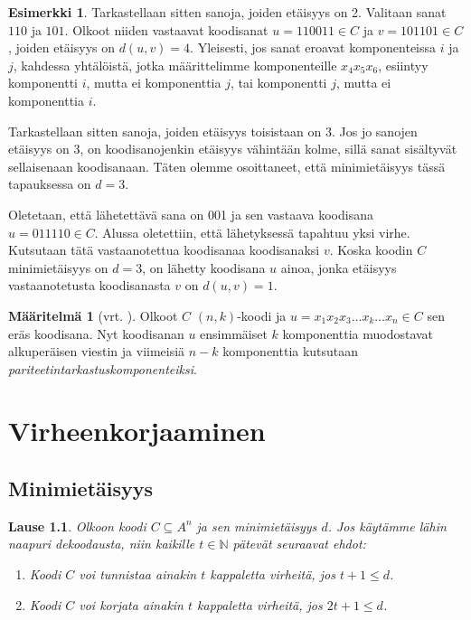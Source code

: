 \documentclass[a4paper,12pt,leqno,oneside]{report} %
\theoremstyle{plain}
\newtheorem{lause}{Lause}[chapter]
\theoremstyle{plain}
\theoremstyle{definition}
\newtheorem{maaritelma}{Määritelmä}[chapter]
\newtheorem{esimerkki}{Esimerkki}[chapter]
\theoremstyle{remark}
\numberwithin{equation}{chapter}
\newcommand*{\Nset}{\mathbb{N}}  %
\begin{document}
\begin{esimerkki}
        Tarkastellaan sitten sanoja, joiden etäisyys on 2. Valitaan sanat $110$ ja $101$. Olkoot niiden vastaavat koodisanat $u = 110011 \in C$ ja $v = 101101 \in C$, joiden etäisyys on $d(u, v) = 4$. Yleisesti, jos sanat eroavat komponenteissa $i$ ja $j$, kahdessa yhtälöistä, jotka määrittelimme komponenteille $x_4x_5x_6$, esiintyy komponentti $i$, mutta ei komponenttia $j$, tai komponentti $j$, mutta ei komponenttia $i$.%

        Tarkastellaan sitten sanoja, joiden etäisyys toisistaan on 3. Jos jo sanojen etäisyys on 3, on koodisanojenkin etäisyys vähintään kolme, sillä sanat sisältyvät sellaisenaan koodisanaan. Täten olemme osoittaneet, että minimietäisyys tässä tapauksessa on $d = 3$.

        Oletetaan, että lähetettävä sana on 001 ja sen vastaava koodisana $u = 011110 \in C$.
        Alussa oletettiin, että lähetyksessä tapahtuu yksi virhe. Kutsutaan tätä vastaanotettua koodisanaa koodisanaksi $v$. Koska koodin $C$ minimietäisyys on $d = 3$, on lähetty koodisana $u$ ainoa, jonka etäisyys vastaanotetusta koodisanasta $v$ on $d(u,v) = 1$.
    \end{esimerkki}

    \begin{maaritelma}[vrt. {\cite[s.~494]{PA}}]\label{maar:nkkoodi}
        Olkoot $C$ $(n, k)$-koodi ja $u = x_1x_2x_3\dots x_k \dots x_n \in C$ sen eräs koodisana. Nyt koodisanan $u$ ensimmäiset $k$ komponenttia muodostavat alkuperäisen viestin ja viimeisiä $n-k$ komponenttia kutsutaan \emph{pariteetintarkastuskomponenteiksi}.
    \end{maaritelma}

    \chapter{Virheenkorjaaminen}
    \section{Minimietäisyys}

    \begin{lause}\label{lause:nncorrection}
        Olkoon koodi $C \subseteq A^n$ ja sen minimietäisyys $d$. Jos käytämme lähin naapuri dekoodausta, niin kaikille $t \in \Nset$ pätevät seuraavat ehdot:
        \begin{enumerate}
            \item\label{kht:vtunnistus} Koodi $C$ voi tunnistaa ainakin $t$ kappaletta virheitä, jos $t + 1 \le d$.
            \item\label{kht:vkorjaus} Koodi $C$ voi korjata ainakin $t$ kappaletta virheitä, jos $2t + 1 \le d$.
        \end{enumerate}
    \end{lause}
\end{document}
